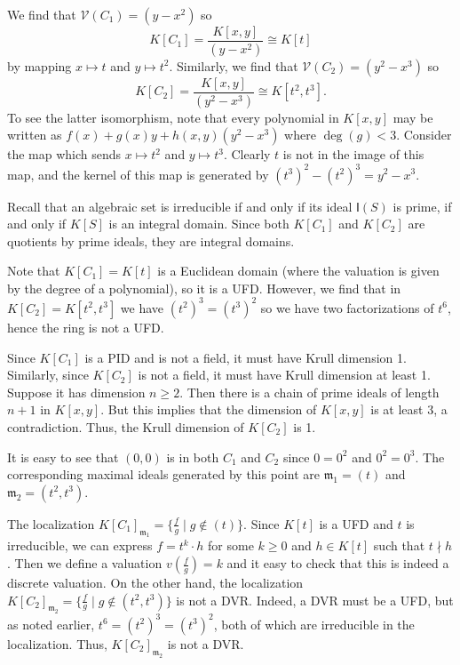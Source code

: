 \documentclass[../../master.tex]{subfiles}
\begin{document}
\begin{solution}
    We find that $\mathscr{V}(C_1) = (y - x^2)$ so
    \[
        K[C_1] = \frac{K[x, y]}{(y - x^2)} \cong K[t] 
    \]
    by mapping $x \mapsto t$ and $y \mapsto t^2$.
    Similarly, we find that $\mathscr{V}(C_2) = (y^2 - x^3)$ so
    \[
        K[C_2] = \frac{K[x, y]}{(y^2 - x^3)} \cong K[t^2, t^3].
    \]
    To see the latter isomorphism, note that every polynomial in $K[x, y]$ may be written as $f(x) + g(x)y + h(x, y)(y^2 - x^3)$ where $\deg(g) < 3$.
    Consider the map which sends $x \mapsto t^2$ and $y \mapsto t^3$.
    Clearly $t$ is not in the image of this map, and the kernel of this map is generated by $(t^3)^2 - (t^2)^3 = y^2 - x^3$.

    Recall that an algebraic set is irreducible if and only if its ideal $\mathsf{I}(S)$ is prime, if and only if $K[S]$ is an integral domain.
    Since both $K[C_1]$ and $K[C_2]$ are quotients by prime ideals, they are integral domains.

    Note that $K[C_1] = K[t]$ is a Euclidean domain (where the valuation is given by the degree of a polynomial), so it is a UFD.
    However, we find that in $K[C_2] = K[t^2, t^3]$ we have $(t^2)^3 = (t^3)^2$ so we have two factorizations of $t^{6}$, hence the ring is not a UFD.

    Since $K[C_1]$ is a PID and is not a field, it must have Krull dimension 1.
    Similarly, since $K[C_2]$ is not a field, it must have Krull dimension at least 1.
    Suppose it has dimension $n \geq 2$.
    Then there is a chain of prime ideals of length $n + 1$ in $K[x, y]$.
    But this implies that the dimension of $K[x, y]$ is at least 3, a contradiction.
    Thus, the Krull dimension of $K[C_2]$ is 1.

    It is easy to see that $(0, 0)$ is in both $C_1$ and $C_2$ since $0 = 0^2$ and $0^2 = 0^3$.
    The corresponding maximal ideals generated by this point are $\mathfrak{m}_1 = (t)$ and $\mathfrak{m}_2 = (t^2, t^3)$.

    The localization $K[C_1]_{\mathfrak{m}_1} = \{\frac{f}{g} \mid g \notin (t)\}$. 
    Since $K[t]$ is a UFD and $t$ is irreducible, we can express $f = t^{k} \cdot h$ for some $k \geq 0$ and $h \in K[t]$ such that $t \nmid h$.
    Then we define a valuation $v(\frac{f}{g}) = k$ and it easy to check that this is indeed a discrete valuation.
    On the other hand, the localization $K[C_2]_{\mathfrak{m}_2} = \{\frac{f}{g} \mid g \notin(t^2, t^3)\}$ is not a DVR.
    Indeed, a DVR must be a UFD, but as noted earlier, $t^{6} = (t^2)^3 = (t^3)^2$, both of which are irreducible in the localization.
    Thus, $K[C_2]_{\mathfrak{m}_2}$ is not a DVR.
\end{solution}
\end{document}
